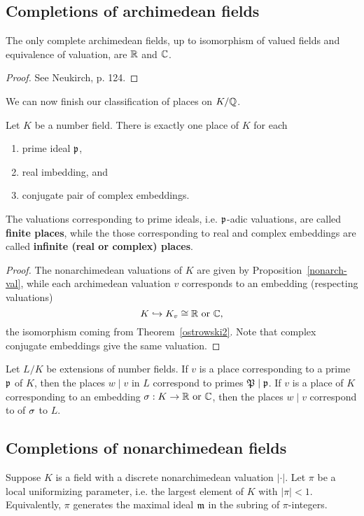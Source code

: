 \subsection{Completions of archimedean fields}
\begin{thm}[Ostrowski]
The only complete archimedean fields, up to isomorphism of valued fields and equivalence of valuation, are $\mathbb{R}$ and $\mathbb{C}$.
\end{thm}
\begin{proof}
See Neukirch, p. 124.
\end{proof}
We can now finish our classification of places on $K/\mathbb{Q}$.
\begin{thm}
Let $K$ be a number field. There is exactly one place of $K$ for each
\begin{enumerate}
\item
prime ideal $\mathfrak{p}$,
\item 
real imbedding, and
\item conjugate pair of complex embeddings.
\end{enumerate}
\end{thm}
The valuations corresponding to prime ideals, i.e. $\mathfrak{p}$-adic valuations, are called \textbf{finite places}, while the those corresponding to real and complex embeddings are called \textbf{infinite (real or complex) places}.
\begin{proof}
The nonarchimedean valuations of $K$ are given by Proposition~\ref{nonarch-val}, while each archimedean valuation $v$ corresponds to an embedding (respecting valuations)
\[
K\hookrightarrow K_v\cong \mathbb{R}\text{ or }\mathbb{C},
\]
the isomorphism coming from Theorem~\ref{ostrowski2}. Note that complex conjugate embeddings give the same valuation.
\end{proof}
\begin{cor}
Let $L/K$ be extensions of number fields. If $v$ is a place corresponding to a prime $\mathfrak{p}$ of $K$, then the places $w\mid v$ in $L$ correspond to primes $\mathfrak{P}\mid \mathfrak{p}$. If $v$ is a place of $K$ corresponding to an embedding $\sigma:K\to \mathbb{R}\text{ or }\mathbb{C}$, then the places $w\mid v$ correspond to of $\sigma$ to $L$.
\end{cor}
\subsection{Completions of nonarchimedean fields}
Suppose $K$ is a field with a discrete nonarchimedean valuation $|\cdot|$. Let $\pi$ be a local uniformizing parameter, i.e. the largest element of $K$ with $|\pi|<1$. Equivalently, $\pi$ generates the maximal ideal $\mathfrak{m}$ in the subring of $\pi$-integers.

